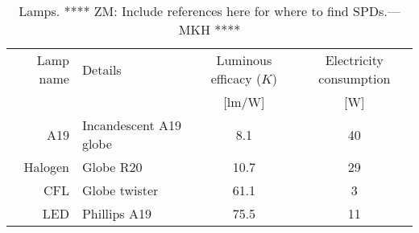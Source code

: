 

\begin{table}
\centering %
\caption{Lamps. **** ZM: Include references here for where to find SPDs.---MKH ****}
\begin{tabular}{r l c c}
  \toprule
  Lamp name 
      & Details 
      & Luminous efficacy ($K$)  
      & Electricity consumption \\
  
      &
      & [lm/W]
      & [W] \\
  \midrule
  A19    
      & Incandescent A19 globe
      & 8.1
      & 40 \\
  Halogen
      & Globe R20
      & 10.7
      & 29 \\
  CFL
      & Globe twister
      & 61.1
      & 3 \\
  LED
      & Phillips A19
      & 75.5
      & 11 \\
  \bottomrule
\end{tabular}
\label{tab:lamps}
\end{table}

